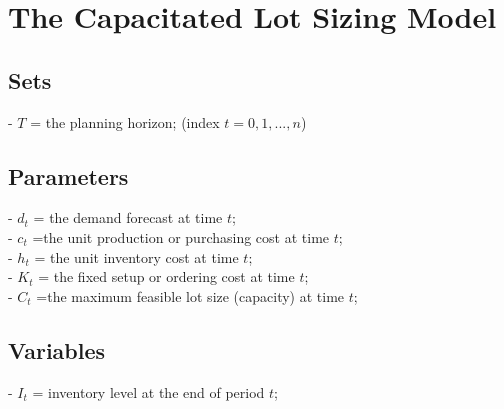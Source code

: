 \documentclass[a4paper,12pt,titlepage]{article}
\begin{document}
\section*{The Capacitated Lot Sizing Model}
\subsection*{Sets}
- $T$ = the planning horizon; (index $t=0,1,...,n$)
\subsection*{Parameters}
- $d_t$ = the demand forecast at time $t$;\\

- $c_t$ =the unit production or purchasing cost at time $t$;\\

- $h_t$ = the unit inventory cost at time $t$;\\

- $K_t$ = the fixed setup or ordering cost at time $t$;\\

- $C_t$ =the maximum feasible lot size (capacity) at time $t$;\\
\subsection*{Variables}
- $I_t$ = inventory level at the end of period $t$;\\
\end{document}

